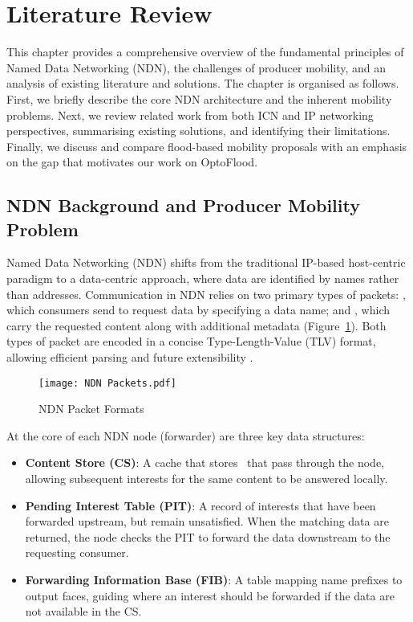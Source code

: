 \section{Literature Review}
This chapter provides a comprehensive overview of the fundamental principles of Named Data Networking (NDN), the challenges of producer mobility, and an analysis of existing literature and solutions. The chapter is organised as follows. First, we briefly describe the core NDN architecture and the inherent mobility problems. Next, we review related work from both ICN and IP networking perspectives, summarising existing solutions, and identifying their limitations. Finally, we discuss and compare flood-based mobility proposals with an emphasis on the gap that motivates our work on OptoFlood.

\subsection{NDN Background and Producer Mobility Problem}
Named Data Networking (NDN) shifts from the traditional IP-based host-centric paradigm to a data-centric approach, where data are identified by names rather than addresses. Communication in NDN relies on two primary types of packets: \InterestPackets, which consumers send to request data by specifying a data name; and \DataPackets, which carry the requested content along with additional metadata (Figure~\ref{NDN Packets}). Both types of packet are encoded in a concise Type-Length-Value (TLV) format, allowing efficient parsing and future extensibility \cite{Zhang-14}.

\begin{figure}[t]
    \centering
    \texttt{[image: NDN Packets.pdf]}
    \caption{NDN Packet Formats}
    \label{NDN Packets}
\end{figure}

At the core of each NDN node (forwarder) are three key data structures:
\begin{itemize}
    \item \textbf{Content Store (CS)}: A cache that stores \DataPackets\ that pass through the node, allowing subsequent interests for the same content to be answered locally.
    \item \textbf{Pending Interest Table (PIT)}: A record of interests that have been forwarded upstream, but remain unsatisfied. When the matching data are returned, the node checks the PIT to forward the data downstream to the requesting consumer.
    \item \textbf{Forwarding Information Base (FIB)}: A table mapping name prefixes to output faces, guiding where an interest should be forwarded if the data are not available in the CS.
\end{itemize}

